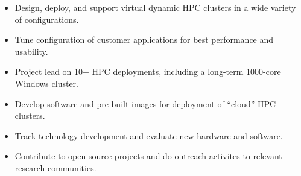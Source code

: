 \documentclass[11pt]{article}
\begin{document}
\begin{itemize}\setlength{\itemsep}{0cm}
  \setlength{\parskip}{0cm}

\item Design, deploy, and support virtual dynamic HPC clusters in a wide variety of configurations.
\item Tune configuration of customer applications for best performance and usability.
\item Project lead on 10+ HPC deployments, including a long-term 1000-core Windows cluster.
\item Develop software and pre-built images for deployment of ``cloud'' HPC clusters.
\item Track technology development and evaluate new hardware and software.
\item Contribute to open-source projects and do outreach activites to relevant research communities.

\end{itemize}
\end{document}
